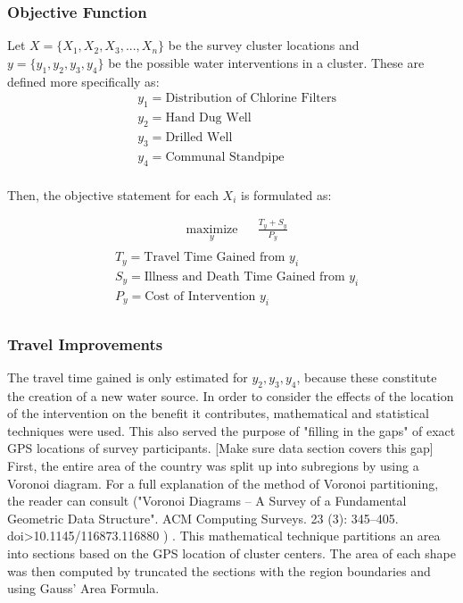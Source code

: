 \subsubsection*{Objective Function}
Let $X = \{X_1,X_2,X_3,...,X_n\}$ be the survey cluster locations and $y = \{y_1,y_2,y_3,y_4\}$ be the possible water interventions in a cluster.
These are defined more specifically as:
\begin{equation}
\begin{aligned} 
& y_1 = \text{Distribution of Chlorine Filters}\\
& y_2 = \text{Hand Dug Well}\\
& y_3 = \text{Drilled Well}\\
& y_4 = \text{Communal Standpipe}\\
\end{aligned}
\end{equation}

Then, the objective statement for each $X_i$ is formulated as: %

\begin{equation}
\begin{aligned}
& \underset{y}{\text{maximize}}
& & \frac{T_y + S_y}{P_y}  \\
\end{aligned}
\end{equation}
\begin{equation*}
\begin{aligned}
& T_y = \text{Travel Time Gained from } y_i \\
& S_y = \text{Illness and Death Time Gained from } y_i \\
& P_y = \text{Cost of Intervention } y_i \\
\end{aligned}
\end{equation*}

\subsubsection*{Travel Improvements}
The travel time gained is only estimated for $y_2,y_3,y_4$, because these constitute the creation of a new water source.
In order to consider the effects of the location of the intervention on the benefit it contributes, mathematical and statistical techniques were used.
This also served the purpose of "filling in the gaps" of exact GPS locations of survey participants.
[Make sure data section covers this gap]
First, the entire area of the country was split up into subregions by using a Voronoi diagram.
For a full explanation of the method of Voronoi partitioning, the reader can consult ("Voronoi Diagrams – A Survey of a Fundamental Geometric Data Structure". ACM Computing Surveys. 23 (3): 345–405.  doi>10.1145/116873.116880 ) .
This mathematical technique partitions an area into sections based on the GPS location of cluster centers. %
The area of each shape was then computed by truncated the sections with the region boundaries and using Gauss' Area Formula. %

